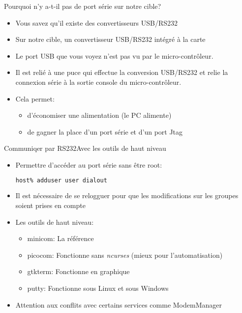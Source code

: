 \begin{frame}{Pourquoi n'y a-t-il pas de port série sur notre cible?}
  \begin{itemize}
  \item Vous savez qu'il existe des convertisseurs USB/RS232
  \item  Sur notre  cible, un  convertisseur USB/RS232  intégré  à la
    carte
  \item   Le  port  USB   que  vous   voyez  n'est   pas  vu   par  le
    micro-contrôleur.
  \item Il est  relié à une puce qui  effectue la conversion USB/RS232
    et   relie  la   connexion   série  à   la   sortie  console   du
    micro-contrôleur.
  \item Cela permet:
    \begin{itemize}
    \item d'économiser une alimentation (le PC alimente)
    \item  de  gagner la  place  d'un port  série  et  d'un port  Jtag
    \end{itemize}
  \end{itemize}
\end{frame}

\begin{frame}[fragile=singleslide]{Communiqer par RS232}{Avec les outils de haut niveau}
  \begin{itemize}
  \item Permettre d'accéder au port série sans être root:
\begin{lstlisting}[language=sh]
host% adduser user dialout
\end{lstlisting} %
  \item Il est nécessaire de se relogguer pour que les modifications sur les 
    groupes soient prises en compte
  \item Les outils de haut niveau: 
  \begin{itemize}
  \item minicom: La référence
  \item picocom:   Fonctionne   sans  \emph{ncurses}   (mieux   pour
    l'automatisation)
  \item gtkterm: Fonctionne en graphique
  \item putty: Fonctionne sous Linux et sous Windows
  \end{itemize}
  \item Attention aux conflits avec certains services comme ModemManager
  \end{itemize}
\end{frame}

